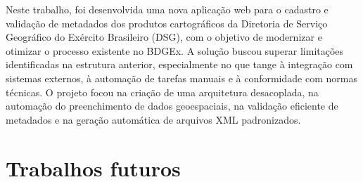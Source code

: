 Neste trabalho, foi desenvolvida uma nova aplicação web para o cadastro e validação de metadados dos produtos cartográficos da Diretoria de Serviço Geográfico do Exército Brasileiro (DSG), com o objetivo de modernizar e otimizar o processo existente no BDGEx. A solução buscou superar limitações identificadas na estrutura anterior, especialmente no que tange à integração com sistemas externos, à automação de tarefas manuais e à conformidade com normas técnicas. O projeto focou na criação de uma arquitetura desacoplada, na automação do preenchimento de dados geoespaciais, na validação eficiente de metadados e na geração automática de arquivos XML padronizados.




\section{Trabalhos futuros}

